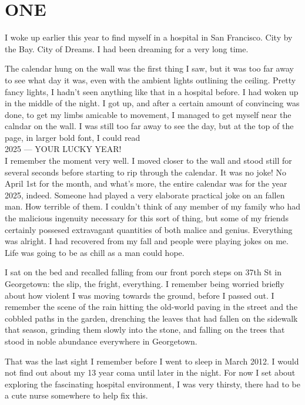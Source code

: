\chapter*{ONE}

I woke up earlier this year to find myself in a hospital in San Francisco. City by the Bay. City of Dreams. I had been dreaming for a very long time.

The calendar hung on the wall was the first thing I saw, but it was too far away to see what day it was, even with the ambient lights outlining the ceiling. Pretty fancy lights, I hadn't seen anything like that in a hospital before. I had woken up in the middle of the night. I got up, and after a certain amount of convincing was done, to get my limbs amicable to movement, I managed to get myself near the calndar on the wall. I was still too far away to see the day, but at the top of the page, in larger bold font, I could read\\


2025 --- YOUR LUCKY YEAR!
\\

\noindent
I remember the moment very well. I moved closer to the wall and stood still for several seconds before starting to rip through the calendar. It was no joke! No April 1st for the month, and what's more, the entire calendar was for the year 2025, indeed. Someone had played a very elaborate practical joke on an fallen man. How terrible of them. I couldn't think of any member of my family who had the malicious ingenuity necessary for this sort of thing, but some of my friends certainly possesed extravagant quantities of both malice and genius. Everything was alright. I had recovered from my fall and people were playing jokes on me. Life was going to be as chill as a man could hope.

I sat on the bed and recalled falling from our front porch steps on 37th St in Georgetown: the slip, the fright, everything. I remember being worried briefly about how violent I was moving towards the ground, before I passed out. I remember the scene of the rain hitting the old-world paving in the street and the cobbled paths in the garden, drenching the leaves that had fallen on the sidewalk that season, grinding them slowly into the stone, and falling on the trees that stood in noble abundance everywhere in Georgetown.

That was the last sight I remember before I went to sleep in March 2012. I would not find out about my 13 year coma until later in the night. For now I set about exploring the fascinating hospital environment, I was very thirsty, there had to be a cute nurse somewhere to help fix this.

